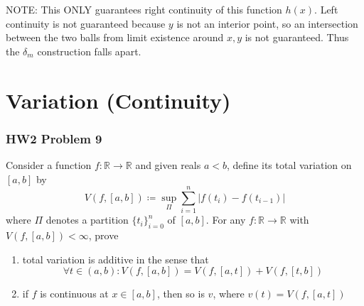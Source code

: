 \documentclass[10pt,letterpaper]{article} %
\begin{document}
NOTE: This ONLY guarantees right continuity of this function $h(x)$. Left continuity is not guaranteed because $y$ is not an interior point, so an intersection between the two balls from limit existence around $x, y$ is not guaranteed. Thus the $\delta_m$ construction falls apart.

\pagebreak
\section{Variation (Continuity)}
\subsubsection{HW2 Problem 9}
Consider a function $f: \mathbb{R} \xrightarrow{} \mathbb{R}$ and given reals $a < b$, define its total variation on $[a, b]$ by
\begin{equation*}
V(f, [a, b]) \coloneq \sup_{\Pi}\sum_{i=1}^{n}|f(t_i) - f(t_{i-1})|
\end{equation*}
where $\Pi$ denotes a partition $\{t_i\}_{i =0}^{n}$ of $[a, b]$. For any $f: \mathbb{R} \xrightarrow{} \mathbb{R}$ with $V(f, [a, b]) < \infty$, prove
\begin{enumerate}
\item total variation is additive in the sense that
\begin{equation*}
\forall t \in (a, b): V(f, [a, b]) = V(f, [a, t]) + V(f, [t, b])
\end{equation*}
\item if $f$ is continuous at $x \in [a, b]$, then so is $v$, where $v(t) = V(f, [a, t])$
\end{enumerate}
\end{document}
